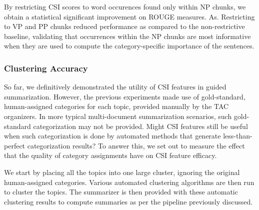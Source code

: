 By restricting CSI scores to word occurences found only within NP chunks, we obtain a statistical significant improvement on ROUGE measures. As.  Restricting to VP and PP chunks reduced performance as compared to the non-restrictive baseline, validating that occurrences within the NP chunks are most informative when they are used to compute the category-specific importance of the sentences.

\subsubsection{Clustering Accuracy}
So far, we definitively demonstrated the utility of CSI features in guided summarization.  However, the previous experiments made use of gold-standard, human-assigned categories for each topic, provided manually by the TAC organizers.
In more typical multi-document summarization scenarios, such gold-standard categorization may not be provided.  Might CSI features still be useful when such categorization is done by automated methods that generate less-than-perfect categorization results?  To answer this, we set out to measure the effect that the quality of category assignments have on CSI feature efficacy. 

We start by placing all the topics into one large cluster, ignoring the original human-assigned categories. Various automated clustering algorithms are then run to cluster the topics. The summarizer is then provided with these automatic clustering results to compute summaries as per the pipeline previously discussed.

